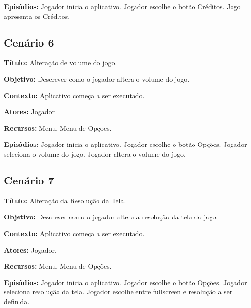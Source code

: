 \textbf{Episódios:} Jogador inicia o aplicativo. Jogador escolhe o botão Créditos. Jogo apresenta os Créditos.

\subsection{Cenário 6}

\textbf{Título:} Alteração de volume do jogo.

\textbf{Objetivo:} Descrever como o jogador altera o volume do jogo.

\textbf{Contexto:} Aplicativo começa a ser executado.

\textbf{Atores:} Jogador

\textbf{Recursos:} Menu, Menu de Opções.

\textbf{Episódios:} Jogador inicia o aplicativo. Jogador escolhe o botão Opções. Jogador seleciona o volume do jogo. Jogador altera o volume do jogo.

\subsection{Cenário 7}

\textbf{Título:} Alteração da Resolução da Tela.

\textbf{Objetivo:} Descrever como o jogador altera a resolução da tela do jogo.

\textbf{Contexto:} Aplicativo começa a ser executado.

\textbf{Atores:} Jogador.

\textbf{Recursos:} Menu, Menu de Opções.

\textbf{Episódios:} Jogador inicia o aplicativo. Jogador escolhe o botão Opções. Jogador seleciona resolução da tela. Jogador escolhe entre fullscreen e {resolução a ser definida}.



